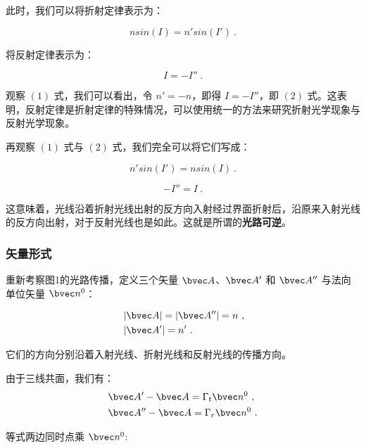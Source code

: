 此时，我们可以将折射定律表示为：

\begin{equation}
nsin(I)=n'sin(I') ~.
\end{equation}

将反射定律表示为：

\begin{equation}
I=-I'' ~.
\end{equation}

观察 $(1)$ 式，我们可以看出，令 $n'=-n$，即得 $I=-I''$，即 $(2)$ 式。这表明，反射定律是折射定律的特殊情况，可以使用统一的方法来研究折射光学现象与反射光学现象。

再观察 $(1)$ 式与 $(2)$ 式，我们完全可以将它们写成：

\begin{equation}
n'sin(I')=nsin(I) ~.
\end{equation}

\begin{equation}
-I''=I ~.
\end{equation}

这意味着，光线沿着折射光线出射的反方向入射经过界面折射后，沿原来入射光线的反方向出射，对于反射光线也是如此。这就是所谓的\textbf{光路可逆}。

\subsubsection{矢量形式}

重新考察图1的光路传播，定义三个矢量 $\bvec A$、$\bvec A'$ 和 $\bvec A''$ 与法向单位矢量 $\bvec n^0$：

\begin{equation}
\begin{align*}
& \left| \bvec A \right| = \left| \bvec A'' \right| = n ~, \\
& \left| \bvec A' \right| = n' ~.
\end{align*}
\end{equation}

它们的方向分别沿着入射光线、折射光线和反射光线的传播方向。

由于三线共面，我们有：
\begin{equation}
\begin{align*}
& \bvec A' - \bvec A = \Gamma _ t \bvec n^0 ~, \\
& \bvec A'' - \bvec A = \Gamma _ r \bvec n^0 ~.
\end{align*}
\end{equation}

等式两边同时点乘 $\bvec n^0$:

